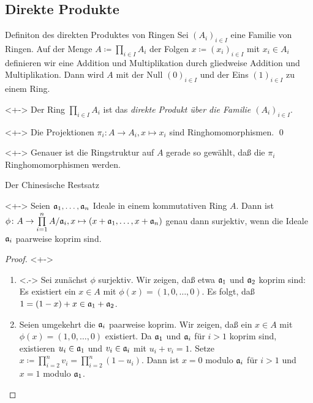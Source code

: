 \subsection{Direkte Produkte}

\begin{frame}{Definiton des direkten Produktes von Ringen}
    Sei \((A_i)_{i \in I}\) eine Familie von Ringen. Auf der Menge
    \(A \coloneqq \prod\limits_{i \in I} A_i\) der Folgen
    \(x \coloneqq (x_i)_{i \in I}\)
    mit \(x_i \in A_i\) definieren wir eine Addition und Multiplikation durch
    gliedweise Addition und Multiplikation. Dann wird \(A\) mit der Null
    \((0)_{i \in I}\) und der Eins \((1)_{i \in I}\) zu einem Ring.
    \begin{definition}<+->
        Der Ring \(\prod\limits_{i \in I} A_i\) ist das \emph{direkte Produkt
        über die Familie \((A_i)_{i \in I}\)}.
    \end{definition}
    \begin{proposition}<+->
        Die Projektionen \(\pi_i\colon A \to A_i, x \mapsto x_i\) sind
        Ringhomomorphismen.
        \qed
    \end{proposition}
    \begin{visibleenv}<+->
        Genauer ist die Ringstruktur auf \(A\) gerade so gewählt, daß die \(\pi_i\)
        Ringhomomorphismen werden.
    \end{visibleenv}
\end{frame}

\begin{frame}{Der Chinesische Restsatz}
    \begin{proposition}<+->
        Seien \(\mathfrak{a}_1, \dotsc, \mathfrak{a}_n\) Ideale in einem kommutativen
        Ring \(A\). Dann ist \(\phi\colon A \to \prod\limits_{i = 1}^n
        A/\mathfrak{a}_i, x \mapsto (x + \mathfrak{a}_1, \dotsc, x + \mathfrak{a}_n)\)
        genau dann surjektiv, wenn die Ideale \(\mathfrak{a}_i\) paarweise
        koprim sind.
    \end{proposition}
    \begin{proof}<+->
        \begin{enumerate}[<+->]
        \item<.->
            Sei zunächst \(\phi\) surjektiv. Wir zeigen, daß etwa \(\mathfrak{a}_1\)
            und \(\mathfrak{a}_2\) koprim sind: Es existiert ein \(x \in A\)
            mit \(\phi(x) = (1, 0, \dotsc, 0)\). Es folgt, daß \(1 = (1 - x) + x
            \in \mathfrak{a}_1 + \mathfrak{a}_2\).
        \item
            Seien umgekehrt die \(\mathfrak{a}_i\) paarweise koprim. Wir
            zeigen, daß ein \(x \in A\) mit \(\phi(x) = (1, 0, \dotsc, 0)\)
            existiert. Da \(\mathfrak{a}_1\) und \(\mathfrak{a}_i\) für \(i > 1\) koprim
            sind, existieren \(u_i \in \mathfrak{a}_1\) und \(v_i \in \mathfrak{a}_i\)
            mit \(u_i + v_i = 1\). Setze \(x \coloneqq \prod\limits_{i = 2}^n
            v_i = \prod\limits_{i = 2}^n (1 - u_i)\). Dann ist \(x = 0\) modulo
            \(\mathfrak{a}_i\) für \(i > 1\) und \(x = 1\) modulo \(\mathfrak{a}_1\).
            \qedhere
        \end{enumerate}
    \end{proof}
\end{frame}

